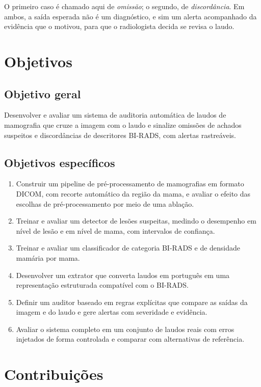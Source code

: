 O primeiro caso é chamado aqui de \textit{omissão}; o segundo, de \textit{discordância}. Em ambos, a saída esperada não é um diagnóstico, e sim um alerta acompanhado da evidência que o motivou, para que o radiologista decida se revisa o laudo.

\section{Objetivos}

\subsection{Objetivo geral}

Desenvolver e avaliar um sistema de auditoria automática de laudos de mamografia que cruze a imagem com o laudo e sinalize omissões de achados suspeitos e discordâncias de descritores BI-RADS, com alertas rastreáveis.

\subsection{Objetivos específicos}

\begin{enumerate}
  \item Construir um pipeline de pré-processamento de mamografias em formato DICOM, com recorte automático da região da mama, e avaliar o efeito das escolhas de pré-processamento por meio de uma ablação.
  \item Treinar e avaliar um detector de lesões suspeitas, medindo o desempenho em nível de lesão e em nível de mama, com intervalos de confiança.
  \item Treinar e avaliar um classificador de categoria BI-RADS e de densidade mamária por mama.
  \item Desenvolver um extrator que converta laudos em português em uma representação estruturada compatível com o BI-RADS.
  \item Definir um auditor baseado em regras explícitas que compare as saídas da imagem e do laudo e gere alertas com severidade e evidência.
  \item Avaliar o sistema completo em um conjunto de laudos reais com erros injetados de forma controlada e comparar com alternativas de referência.
\end{enumerate}

\section{Contribuições}

